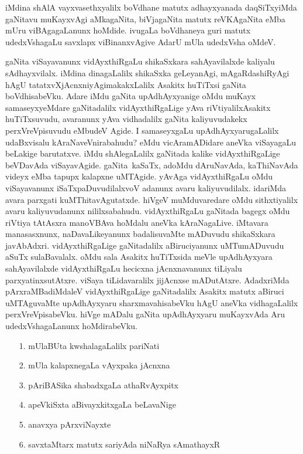 iMdina shAlA vayxvasethxyalilx boVdhane matutx adhayxyanada daqSiTxyiMda gaNitavu muKayxvAgi aMkagaNita, biVjagaNita matutx reVKAgaNita eMba mUru viBAgagaLanunx hoMdide. ivugaLa boVdhaneya guri matutx udedxVshagaLu savxlapx viBinanxvAgive AdarU mUla udedxVsha oMdeV.

gaNita viSayavanunx vidAyxthiRgaLu shikaSxkara sahAyavilalxde kaliyalu sAdhayxvilalx. iMdina dinagaLalilx shikaSxka geLeyanAgi, mAgaRdashiRyAgi hAgU tatatxvXjAcnxniyAgi\break makakxLalilx Asakitx huTiTxsi gaNita boVdhisabeVku. Adare iMdu gaNita upAdhAyxyanige oMdu muKayx samaseyxyeMdare gaNitadalilx vidAyxthiRgaLige yAva riVtiyalilx\break Asakitx huTiTxsuvudu, avaranunx yAva vidhadalilx gaNita kaliyuvudakekx perxVreVpisuvudu eMbudeV Agide. I samaseyxgaLu upAdhAyxyarugaLalilx udaBxvisalu kAraNaveV\-nirabahudu? eMdu vicAramADidare aneVka viSayagaLu beLakige barutatxve. iMdu shAlegaLalilx gaNitada kalike vidAyxthiRgaLige beVDavAda viSayavAgide. gaNita~kaSaTx, adoMdu dAruNavAda, kaThiNavAda videyx eMba tapupx kalapxne uMTAgide. yAvAga vidAyxthiRgaLu oMdu viSayavanunx iSaTxpaDuvudilalxvoV adanunx avaru kaliyuvudilalx. idariMda avara parxgati kuMThitavAgutatxde. hiVgeV muMduvaredare oMdu sithxtiyalilx avaru kaliyuvudanunx nililxsabahudu. vidAyxthiRgaLu gaNitada bagegx oMdu riVtiya tAtAsxra manoVBAva hoMdalu aneVka kAraNagaLive. iMtavara manasasxnunx, naDavaLikeyanunx badalisuvaMte mADuvudu shikaSxkara javAbAdxri. vidAyxthiRgaLige gaNitadalilx aBiruciyanunx uMTumADuvudu aSuTx sulaBavalalx. oMdu sala Asakitx huTiTxsida meVle upAdhAyxyara sahAyavilalxde vidAyxthiRgaLu hecicxna jAcnxnavanunx tiLiyalu parxyatinxsutAtxre. viSaya tiLidavaralilx jijAcnxse mADutAtxre. AdadxriMda pArxraMBadiMdaleV vidAyxthiRgaLige gaNitadalilx Asakitx matutx aBiruci uMTAguvaMte upAdhAyxyaru sharxmavahisabeVku hAgU aneVka vidhagaLalilx perxVreVpisabeVku. hiVge mADalu gaNita upAdhAyxyaru muKayxvAda Aru udedxVsha\-gaLanunx hoMdirabeVku.
\begin{enumerate}
\item[{\rm 1.}] mUlaBUta kwshalagaLalilx pariNati
\item[{\rm 2.}] mUla kalapxnegaLa vAyxpaka jAcnxna
\item[{\rm 3.}] pAriBASika shabadxgaLa athaRvAyxpitx
\item[{\rm 4.}] apeVkiSxta aBivayxkitxgaLa beLavaNige
\item[{\rm 5.}] anavxya pArxviNayxte
\item[{\rm 6.}] savxtaMtarx matutx sariyAda niNaRya sAmathayxR
\end{enumerate}

